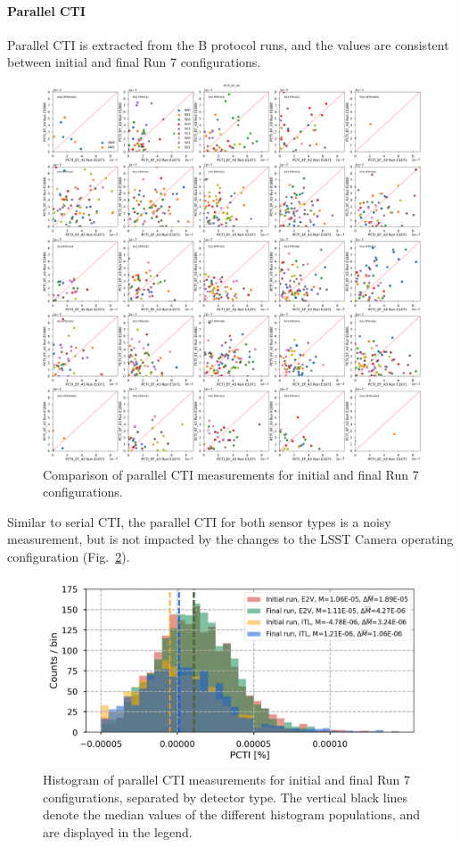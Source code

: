 \clearpage


\paragraph{Parallel CTI}\label{sec:finalChar-parallel-cti}

Parallel CTI is extracted from the B protocol runs, and the values are consistent between initial and final Run 7 configurations. 

\begin{figure}[ht]
    \centering
    \includegraphics[width=0.7\linewidth]{figures/finalCharacterization/E1071_E1880_PCTI_EF_43_inset.png}
    \caption{Comparison of parallel CTI measurements for initial and final Run 7 configurations.}
    \label{fig:finalChar-PCTI-5x5}
\end{figure}

Similar to serial CTI, the parallel CTI for both sensor types is a noisy measurement, but is not impacted by the changes to the LSST Camera operating configuration (Fig.~\ref{fig:finalChar-PCTI-hist}). 

\begin{figure}[ht]
    \centering
    \includegraphics[width=0.7\linewidth]{figures/finalCharacterization/PCTIComp(3).jpg}
    \caption{Histogram of parallel CTI measurements for initial and final Run 7 configurations, separated by detector type. The vertical black lines denote the median values of the different histogram populations, and are displayed in the legend.}
    \label{fig:finalChar-PCTI-hist}
\end{figure}

